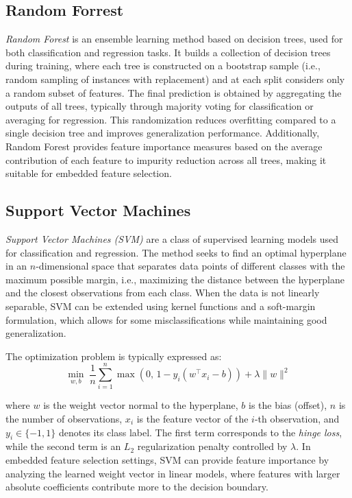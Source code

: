\subsection{Random Forrest}
\emph{Random Forest} \cite{breiman2001} is an ensemble learning method based on decision trees, used for both classification and regression tasks. It builds a collection of decision trees during training, where each tree is constructed on a bootstrap sample (i.e., random sampling of instances with replacement) and at each split considers only a random subset of features. The final prediction is obtained by aggregating the outputs of all trees, typically through majority voting for classification or averaging for regression. This randomization reduces overfitting compared to a single decision tree and improves generalization performance. Additionally, Random Forest provides feature importance measures based on the average contribution of each feature to impurity reduction across all trees, making it suitable for embedded feature selection.

\subsection{Support Vector Machines}
\emph{Support Vector Machines (SVM)} \cite{cortes1995svm} are a class of supervised learning models used for classification and regression. The method seeks to find an optimal hyperplane in an $n$-dimensional space that separates data points of different classes with the maximum possible margin, i.e., maximizing the distance between the hyperplane and the closest observations from each class. When the data is not linearly separable, SVM can be extended using kernel functions and a soft-margin formulation, which allows for some misclassifications while maintaining good generalization.

The optimization problem is typically expressed as:
\[
\min_{w,b} \; \frac{1}{n} \sum_{i=1}^{n} \max\left(0,\, 1 - y_i (w^\top x_i - b)\right) + \lambda \|w\|^2
\]

where \( w \) is the weight vector normal to the hyperplane, $b$ is the bias (offset), \break \( n \) is the number of observations, \( x_i \) is the feature vector of the \( i \)-th observation, and \( y_i \in \{-1,1\} \) denotes its class label. The first term corresponds to the \emph{hinge loss}, while the second term is an \( L_2 \) regularization penalty controlled by \( \lambda \). In embedded feature selection settings, SVM can provide feature importance by analyzing the learned weight vector in linear models, where features with larger absolute coefficients contribute more to the decision boundary.

